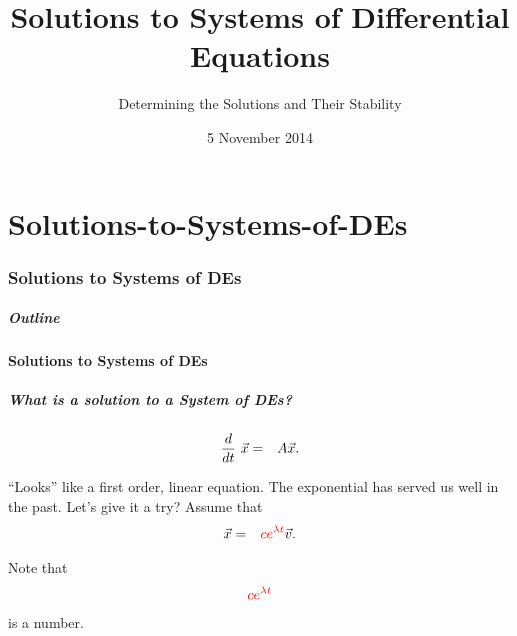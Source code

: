 \part{Solutions-to-Systems-of-DEs}
\section{Solutions to Systems of DEs}


\title{Solutions to Systems of Differential Equations}
\subtitle{Determining the Solutions and Their Stability}
\date{5 November 2014}

\begin{frame}
  \titlepage
\end{frame}

\begin{frame}
  \frametitle{Outline}
  \tableofcontents[ currentsection ]
\end{frame}


\subsection{Solutions to Systems of DEs}


\begin{frame}
  \frametitle{What is a solution to a System of DEs?}

  \begin{eqnarray*}
    \deriv{~}{t} \vec{x} & = & A \vec{x}.
  \end{eqnarray*}

  {
    ``Looks'' like a first order, linear equation. The exponential has
    served us well in the past. Let's give it a try? Assume that 
    \begin{eqnarray*}
      \vec{x} & = & \redText{c e^{\lambda t}} \vec{v}.
    \end{eqnarray*}

    \vfill
    Note that
    \begin{eqnarray*}
      \redText{c e^{\lambda t}}
    \end{eqnarray*}
    is a  number.
  }


\end{frame}


